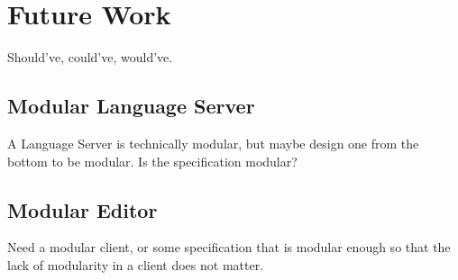 \chapter{Future Work}

Should've, could've, would've.

\section{Modular Language Server}

A Language Server is technically modular, but maybe design one from the bottom
to be modular. Is the specification modular?

\section{Modular Editor}

Need a modular client, or some specification that is modular enough so that the
lack of modularity in a client does not matter.
